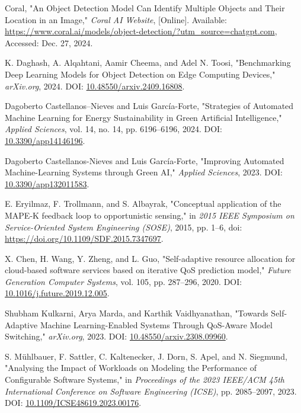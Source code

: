 \begin{thebibliography}{00}
Coral,
"An Object Detection Model Can Identify Multiple Objects and Their Location in an Image,"
\textit{Coral AI Website}, [Online]. Available: \url{https://www.coral.ai/models/object-detection/?utm_source=chatgpt.com}, Accessed: Dec. 27, 2024.

K. Daghash, A. Alqahtani, Aamir Cheema, and Adel N. Toosi,
"Benchmarking Deep Learning Models for Object Detection on Edge Computing Devices,"
\textit{arXiv.org}, 2024.
DOI: \href{https://doi.org/10.48550/arxiv.2409.16808}{10.48550/arxiv.2409.16808}.

Dagoberto Castellanos–Nieves and Luis García-Forte,
"Strategies of Automated Machine Learning for Energy Sustainability in Green Artificial Intelligence,"
\textit{Applied Sciences}, vol. 14, no. 14, pp. 6196--6196, 2024.
DOI: \href{https://doi.org/10.3390/app14146196}{10.3390/app14146196}.

Dagoberto Castellanos-Nieves and Luis García-Forte,
"Improving Automated Machine-Learning Systems through Green AI,"
\textit{Applied Sciences}, 2023.
DOI: \href{https://doi.org/10.3390/app132011583}{10.3390/app132011583}.

E. Eryilmaz, F. Trollmann, and S. Albayrak, "Conceptual application of the MAPE-K feedback loop to opportunistic sensing," in \textit{2015 IEEE Symposium on Service-Oriented System Engineering (SOSE)}, 2015, pp. 1--6, doi: \href{https://doi.org/10.1109/SDF.2015.7347697}{https://doi.org/10.1109/SDF.2015.7347697}.

X. Chen, H. Wang, Y. Zheng, and L. Guo,
"Self-adaptive resource allocation for cloud-based software services based on iterative QoS prediction model,"
\textit{Future Generation Computer Systems}, vol. 105, pp. 287--296, 2020.
DOI: \href{https://doi.org/10.1016/j.future.2019.12.005}{10.1016/j.future.2019.12.005}.

Shubham Kulkarni, Arya Marda, and Karthik Vaidhyanathan,
"Towards Self-Adaptive Machine Learning-Enabled Systems Through QoS-Aware Model Switching,"
\textit{arXiv.org}, 2023.
DOI: \href{https://doi.org/10.48550/arxiv.2308.09960}{10.48550/arxiv.2308.09960}.

S. Mühlbauer, F. Sattler, C. Kaltenecker, J. Dorn, S. Apel, and N. Siegmund,
"Analysing the Impact of Workloads on Modeling the Performance of Configurable Software Systems,"
in \textit{Proceedings of the 2023 IEEE/ACM 45th International Conference on Software Engineering (ICSE)}, pp. 2085--2097, 2023.
DOI: \href{https://doi.org/10.1109/ICSE48619.2023.00176}{10.1109/ICSE48619.2023.00176}.


\end{thebibliography}
